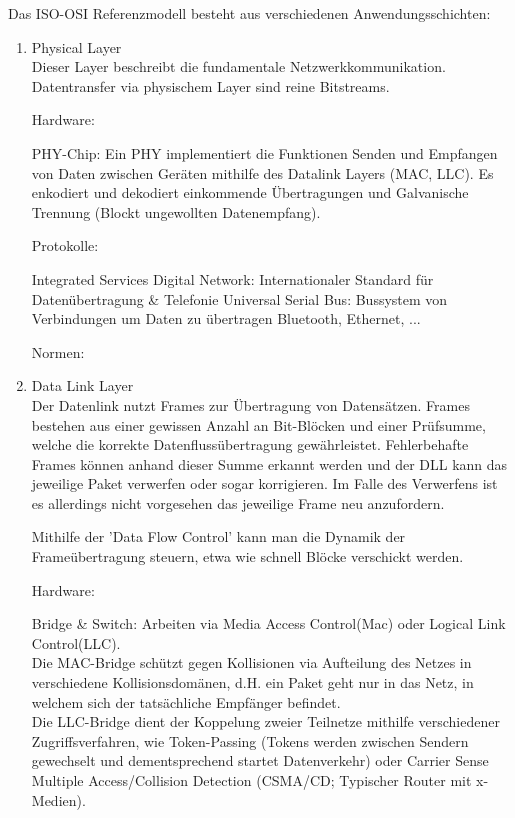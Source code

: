 \documentclass[11pt]{article}
\begin{document}
    Das ISO-OSI Referenzmodell besteht aus verschiedenen Anwendungsschichten:
    \begin{enumerate}
        \item Physical Layer\\
        Dieser Layer beschreibt die fundamentale Netzwerkkommunikation. Datentransfer via
        physischem Layer sind reine Bitstreams.

        Hardware:
        \begin{addmargin}[1em]{1em}
            PHY-Chip: Ein PHY implementiert die Funktionen Senden und Empfangen von Daten zwischen
            Geräten mithilfe des Datalink Layers (MAC, LLC). Es enkodiert und dekodiert einkommende
            Übertragungen und Galvanische Trennung (Blockt ungewollten Datenempfang).
        \end{addmargin}

        Protokolle:
        \begin{addmargin}[1em]{1em}
            Integrated Services Digital Network: Internationaler Standard für Datenübertragung \& Telefonie
            Universal Serial Bus: Bussystem von Verbindungen um Daten zu übertragen
            Bluetooth, Ethernet, ...
        \end{addmargin}

        Normen: %

        \item Data Link Layer\\
        Der Datenlink nutzt Frames zur Übertragung von Datensätzen. Frames bestehen aus einer gewissen Anzahl
        an Bit-Blöcken und einer Prüfsumme, welche die korrekte Datenflussübertragung gewährleistet.
        Fehlerbehafte Frames können anhand dieser Summe erkannt werden und der DLL kann das jeweilige Paket verwerfen
        oder sogar korrigieren.
        Im Falle des Verwerfens ist es allerdings nicht vorgesehen das jeweilige Frame neu anzufordern.

        Mithilfe der 'Data Flow Control' kann man die Dynamik der Frameübertragung steuern, etwa wie schnell
        Blöcke verschickt werden.

        Hardware:
        \begin{addmargin}[1em]{1em} %
            Bridge \& Switch: Arbeiten via Media Access Control(Mac) oder Logical Link Control(LLC).\\
            Die MAC-Bridge schützt gegen Kollisionen via Aufteilung des Netzes in verschiedene Kollisionsdomänen, d.H.
            ein Paket geht nur in das Netz, in welchem sich der tatsächliche Empfänger befindet.\\
            Die LLC-Bridge dient der Koppelung zweier Teilnetze mithilfe verschiedener Zugriffsverfahren, wie
            Token-Passing (Tokens werden zwischen Sendern gewechselt und dementsprechend startet Datenverkehr) oder
            Carrier Sense Multiple Access/Collision Detection (CSMA/CD; Typischer Router mit x-Medien).\\
        \end{addmargin}


\end{enumerate}
\end{document}

